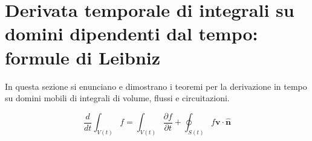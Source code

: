 
\newpage \clearpage

\section{Derivata temporale di integrali su domini dipendenti dal tempo: formule di Leibniz}\label{sec:richiami:leibniz}
In questa sezione si enunciano e dimostrano i teoremi per la derivazione in tempo su domini mobili di integrali di volume, flussi e circuitazioni.
 
\begin{theorem}\label{thm:reynolds}
%
\begin{equation}
  \frac{d}{dt}\int_{V(t)} f = 
  \int_{V(t)} \frac{\partial f}{\partial t} + 
  \oint_{S(t)} f \bm{v} \cdot \bm{\hat{n}}
\end{equation}
\end{theorem}

